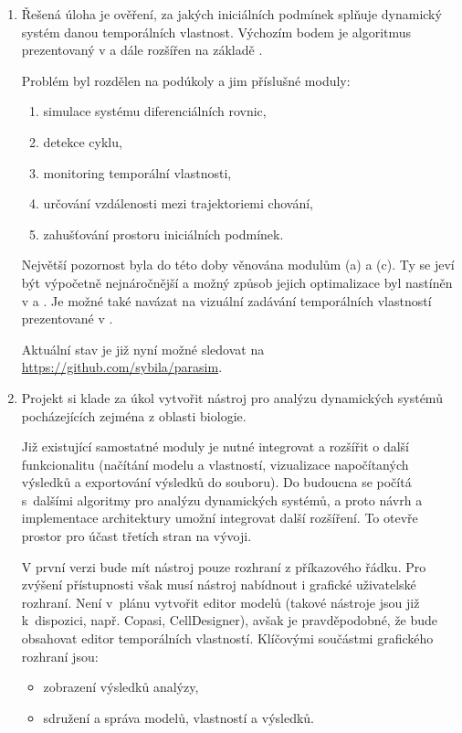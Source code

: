 \documentclass[a4paper]{article}
\begin{document}
\begin{enumerate}

\item   Řešená úloha je ověření, za jakých iniciálních podmínek splňuje
        dynamický systém danou temporálních vlastnost. Výchozím bodem je algoritmus
        prezentovaný v \cite{drazan_master} a dále rozšířen na základě \cite{robustness}.

        Problém byl rozdělen na podúkoly a jim příslušné moduly:
        \begin{enumerate}
            \item   simulace systému diferenciálních rovnic,
            \item   detekce cyklu,
            \item   monitoring temporální vlastnosti,
            \item   určování vzdálenosti mezi trajektoriemi chování,
            \item   zahušťování prostoru iniciálních podmínek.
        \end{enumerate}

        Největší pozornost byla do této doby věnována modulům (a) a (c). Ty se jeví
        být výpočetně nejnáročnější a možný způsob jejich optimalizace byl nastíněn
        v \cite{papousek_bachelor} a \cite{kovacik_bachelor}. Je možné také navázat
        na vizuální zadávání temporálních vlastností prezentované v \cite{vejpustek_bachelor}.
        
        Aktuální stav je již nyní možné sledovat na \url{https://github.com/sybila/parasim}.

\item   Projekt si klade za úkol vytvořit nástroj pro analýzu dynamických systémů
        pocházejících zejména z oblasti biologie.

        Již existující samostatné moduly je nutné integrovat a rozšířit o další
        funkcionalitu (načítání modelu a vlastností, vizualizace napočítaných
        výsledků a exportování výsledků do souboru). Do budoucna se počítá s~dalšími
        algoritmy pro analýzu dynamických systémů, a proto návrh a implementace
        architektury umožní integrovat další rozšíření. To otevře prostor pro účast
        třetích stran na vývoji.

        V první verzi bude mít nástroj pouze rozhraní z příkazového řádku. Pro zvýšení
        přístupnosti však musí nástroj nabídnout i grafické uživatelské rozhraní. Není
        v~plánu vytvořit editor modelů (takové nástroje jsou již k~dispozici, např. Copasi, CellDesigner),
        avšak je pravděpodobné, že bude obsahovat editor temporálních vlastností. 
        Klíčovými součástmi grafického rozhraní jsou:
        \begin{itemize}
            \item   zobrazení výsledků analýzy,
            \item   sdružení a správa modelů, vlastností a výsledků.
        \end{itemize}


\end{enumerate}
\end{document}

